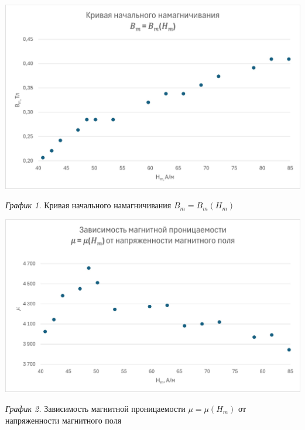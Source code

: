 \hypertarget{diagram1}{}

\begin{center}
    \includegraphics[width=15cm]{images/B_m.jpg}

    \smallvspace

    \textit{График 1.} Кривая начального намагничивания $B_m = B_m(H_m)$
\end{center}

\hypertarget{diagram2}{}

\begin{center}
    \includegraphics[width=15cm]{images/mu.jpg}

    \smallvspace

    \textit{График 2.} Зависимость магнитной проницаемости $\mu = \mu(H_m)$ от напряженности магнитного поля
\end{center}

\hypertarget{diagram3}{}

